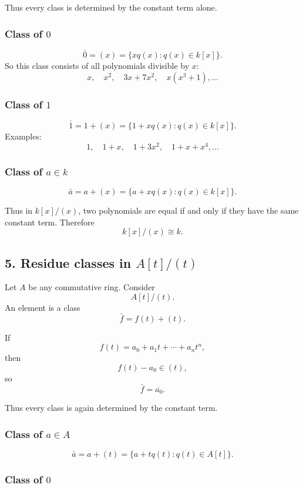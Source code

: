 \documentclass[12pt,a4paper,oneside]{report}
\theoremstyle{notespace}
\begin{document}
	Thus every class is determined by the constant term alone.
	
	\subsubsection{Class of \(0\)}
	
	\[
	\bar 0=(x)=\{xq(x):q(x)\in k[x]\}.
	\]
	So this class consists of all polynomials divisible by \(x\):
	\[
	x,\quad x^2,\quad 3x+7x^2,\quad x(x^3+1),\dots
	\]
	
	\subsubsection{Class of \(1\)}
	
	\[
	\bar 1=1+(x)=\{1+xq(x):q(x)\in k[x]\}.
	\]
	Examples:
	\[
	1,\quad 1+x,\quad 1+3x^2,\quad 1+x+x^4,\dots
	\]
	
	\subsubsection{Class of \(a\in k\)}
	
	\[
	\bar a=a+(x)=\{a+xq(x):q(x)\in k[x]\}.
	\]
	
	Thus in \(k[x]/(x)\), two polynomials are equal if and only if they have the same constant term. Therefore
	\[
	k[x]/(x)\cong k.
	\]
	
	\subsection{5. Residue classes in \(A[t]/(t)\)}
	
	Let \(A\) be any commutative ring. Consider
	\[
	A[t]/(t).
	\]
	An element is a class
	\[
	\bar f=f(t)+(t).
	\]
	
	If
	\[
	f(t)=a_0+a_1t+\cdots+a_nt^n,
	\]
	then
	\[
	f(t)-a_0\in (t),
	\]
	so
	\[
	\bar f=\overline{a_0}.
	\]
	
	Thus every class is again determined by the constant term.
	
	\subsubsection{Class of \(a\in A\)}
	
	\[
	\bar a=a+(t)=\{a+tq(t):q(t)\in A[t]\}.
	\]
	
	\subsubsection{Class of \(0\)}
	
\end{document}
